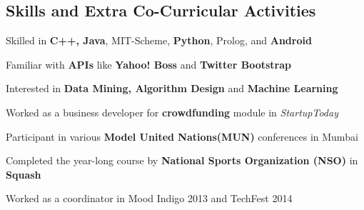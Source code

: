 \documentclass[margin,11pt]{resume}
\begin{document}
\begin{resume}
\section{\mysidestyle Skills and Extra Co-Curricular Activities}
\begin{list2}
\item Skilled in \textbf{C++, Java}, MIT-Scheme, \textbf{Python}, Prolog, \LaTeXe{} and \textbf{Android}
\item Familiar with \textbf{APIs} like \textbf{Yahoo! Boss} and \textbf{Twitter Bootstrap}
\item Interested in \textbf{Data Mining, Algorithm Design} and \textbf{Machine Learning}
\item Worked as a business developer for \textbf{crowdfunding} module in \textsl{StartupToday}
\item Participant in various \textbf{Model United Nations(MUN)} conferences in Mumbai
\item Completed the year-long course by \textbf{National Sports Organization (NSO)} in \textbf{Squash}
\item Worked as a coordinator in Mood Indigo 2013 and TechFest 2014
\end{list2}




 









\end{resume}
\end{document}
